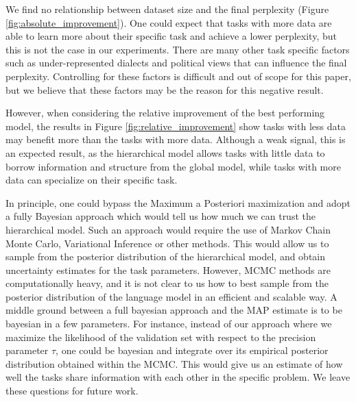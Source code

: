 \documentclass[fullpaper]{nldl}
\begin{document}
We find no relationship between dataset size and the final perplexity (Figure \ref{fig:absolute_improvement}). One could expect that tasks with more data are able to learn more about their specific task and achieve a lower perplexity, but this is not the case in our experiments. There are many other task specific factors such as under-represented dialects and political views that can influence the final perplexity. Controlling for these factors is difficult and out of scope for this paper, but we believe that these factors may be the reason for this negative result.

However, when considering the relative improvement of the best performing model, the results in Figure \ref{fig:relative_improvement} show tasks with less data may benefit more than the tasks with more data. Although a weak signal, this is an expected result, as the hierarchical model allows tasks with little data to borrow information and structure from the global model, while tasks with more data can specialize on their specific task.

In principle, one could bypass the Maximum a Posteriori maximization and adopt a fully Bayesian approach which would tell us how much we can trust the hierarchical model. Such an approach  would require the use of Markov Chain Monte Carlo, Variational Inference or other methods.
This would allow us to sample from the posterior distribution of the hierarchical model, and obtain uncertainty estimates for the task parameters.
However, MCMC methods are computationally heavy, and it is not clear to us how to best sample from the posterior distribution of the language model in an efficient and scalable way.
A middle ground between a full bayesian approach and the MAP estimate is to be bayesian in a few parameters. For instance, instead of our approach where we maximize the likelihood of the validation set with respect to the precision parameter $\tau$, one could be bayesian and integrate over its empirical posterior distribution obtained within the MCMC. This would give us an estimate of how well the tasks share information with each other in the specific problem.
We leave these questions for future work.
\end{document}
